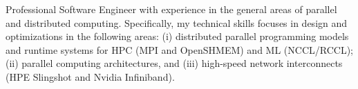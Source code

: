 Professional Software Engineer with experience in the general areas of parallel
and distributed computing. Specifically, my technical skills focuses in design
and optimizations in the following areas:
(i)   distributed parallel programming models and runtime systems for HPC (MPI
      and OpenSHMEM) and ML (NCCL/RCCL);
(ii)  parallel computing architectures, and
(iii) high-speed network interconnects (HPE Slingshot and Nvidia Infiniband).
